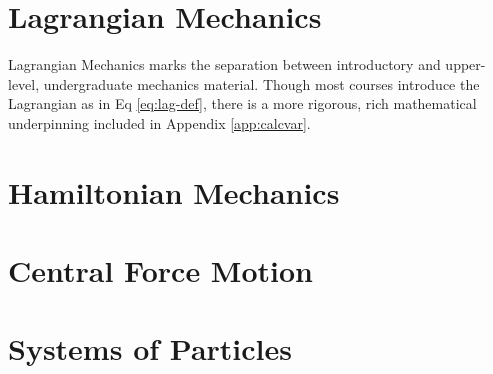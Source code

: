 


\section{Lagrangian Mechanics}
\label{sec:cm-lagrangian}

Lagrangian Mechanics marks the separation between introductory and upper-level, undergraduate mechanics material. Though most courses introduce the Lagrangian as in Eq \ref{eq:lag-def}, there is a more rigorous, rich mathematical underpinning included in Appendix \ref{app:calcvar}.




\section{Hamiltonian Mechanics}
\label{sec:cm-hamiltonian}


\eqn{}


\section{Central Force Motion}
\label{sec:cm-cfm}



\section{Systems of Particles}
\label{sec:cm-particles}



